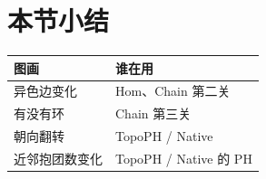 \section{本节小结}

\begin{center}
\begin{tabular}{@{}ll@{}}
\toprule
图画 & 谁在用 \\
\midrule
异色边变化 & Hom、Chain 第二关 \\
有没有环 & Chain 第三关 \\
朝向翻转 & TopoPH / Native \\
近邻抱团数变化 & TopoPH / Native 的 PH \\
\bottomrule
\end{tabular}
\end{center}
